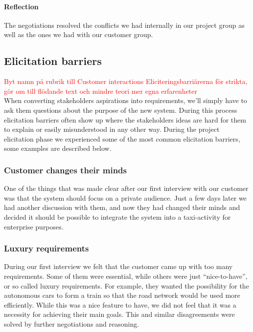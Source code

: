 \documentclass[10pt]{article}
\newcommand\todo[1]{\textcolor{red}{#1}}
\begin{document}
\paragraph{Reflection}
\hfill \break
The negotiations resolved the conflicts we had internally in our project group as well as the ones we had with our customer group.

\subsection{Elicitation barriers}
\todo{Byt namn på rubrik till Customer interactions}
\todo{Eliciteringsbarriärerna för strikta, gör om till flödande text och mindre teori mer egna erfarenheter}
\\
When converting stakeholders aspirations into requirements, we'll simply have to ask them questions about the purpose of the new system. During this process elicitation barriers often show up where the stakeholders ideas are hard for them to explain or easily misunderstood in any other way.
During the project elicitation phase we experienced some of the most common elicitation barriers, some examples are described below.

\subsubsection{Customer changes their minds}
One of the things that was made clear after our first interview with our customer was that the system should focus on a private audience. Just a few days later we had another discussion with them, and now they had changed their minds and decided it should be possible to integrate the system into a taxi-activity for enterprise purposes.

\subsubsection{Luxury requirements}
During our first interview we felt that the customer came up with too many requirements. Some of them were essential, while others were just “nice-to-have”, or so called luxury requirements. For example, they wanted the possibility for the autonomous cars to form a train so that the road network would be used more efficiently. While this was a nice feature to have, we did not feel that it was a necessity for achieving their main goals. This and similar disagreements were solved by further negotiations and reasoning. 
\end{document}
